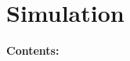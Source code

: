 
\chapter{Simulation} %

\noindent\textbf{\large Contents:}

\noindent\hrulefill
\noindent\startcontents[chapters]
\noindent{}
\noindent\hrulefill

\label{Chapter2} %
